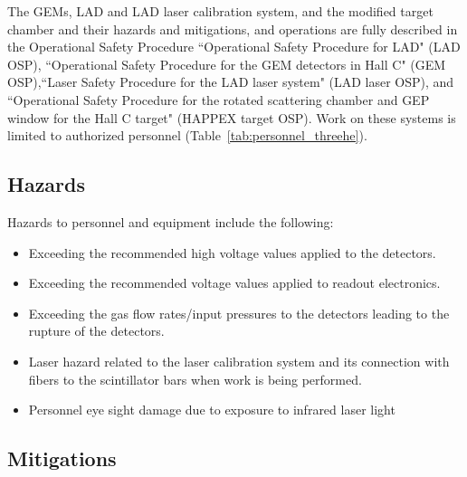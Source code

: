 The GEMs, LAD and LAD laser calibration system, and the modified target chamber and their hazards and mitigations, and operations are fully described in the Operational Safety Procedure ``Operational Safety Procedure for LAD" (LAD OSP), ``Operational Safety Procedure for the GEM detectors in Hall C" (GEM OSP),``Laser Safety Procedure for the LAD laser system" (LAD laser OSP), and ``Operational Safety Procedure for the rotated scattering chamber and GEP window for the Hall C target" (HAPPEX target OSP). Work on these
systems is limited to authorized personnel (Table~\ref{tab:personnel_threehe}).


\subsection{Hazards}
Hazards to personnel and equipment include the following:
\begin{itemize}
\item Exceeding the recommended high voltage values applied to the detectors.
\item Exceeding the recommended voltage values applied to readout electronics. 
\item Exceeding the gas flow rates/input pressures to the detectors leading to the rupture of the detectors.
\item Laser hazard related to the laser calibration system and its connection with fibers to the scintillator bars when work is being performed. 
\item Personnel eye sight damage due to exposure to infrared laser light
\end{itemize}

\subsection{Mitigations}

